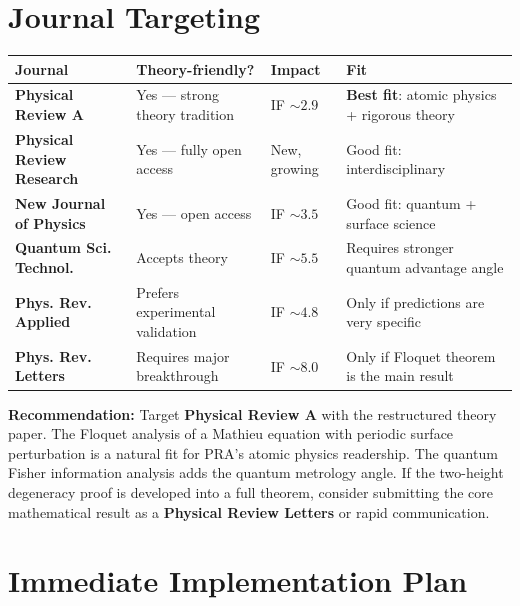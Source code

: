 \documentclass[11pt,a4paper]{article}
\begin{document}
\section{Journal Targeting}

\begin{center}
\begin{tabular}{@{}llll@{}}
\toprule
Journal & Theory-friendly? & Impact & Fit \\
\midrule
\textbf{Physical Review A} & Yes --- strong theory tradition & IF $\sim 2.9$ & \textbf{Best fit}: atomic physics + rigorous theory \\
\textbf{Physical Review Research} & Yes --- fully open access & New, growing & Good fit: interdisciplinary \\
\textbf{New Journal of Physics} & Yes --- open access & IF $\sim 3.5$ & Good fit: quantum + surface science \\
\textbf{Quantum Sci. Technol.} & Accepts theory & IF $\sim 5.5$ & Requires stronger quantum advantage angle \\
\textbf{Phys. Rev. Applied} & Prefers experimental validation & IF $\sim 4.8$ & Only if predictions are very specific \\
\textbf{Phys. Rev. Letters} & Requires major breakthrough & IF $\sim 8.0$ & Only if Floquet theorem is the main result \\
\bottomrule
\end{tabular}
\end{center}

\textbf{Recommendation:} Target \textbf{Physical Review A} with the
restructured theory paper.  The Floquet analysis of a Mathieu equation
with periodic surface perturbation is a natural fit for PRA's atomic
physics readership.  The quantum Fisher information analysis adds the
quantum metrology angle.  If the two-height degeneracy proof is developed
into a full theorem, consider submitting the core mathematical result as
a \textbf{Physical Review Letters} or rapid communication.

\section{Immediate Implementation Plan}
\end{document}
